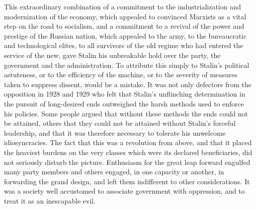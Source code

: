 This extraordinary combination of a commitment to the industrialization and modernization of the economy, which appealed to convinced Marxists as a vital step on the road to socialism, and a commitment to a revival of the power and prestige of the Russian nation, which appealed to the army, to the bureaucratic and technological elites, to all survivors of the old regime who had entered the service of the new, gave Stalin his unbreakable hold over the party, the government and the administration. To attribute this simply to Stalin's political astuteness, or to the efficiency of the machine, or to the severity of measures taken to suppress dissent, would be a mistake. It was not only defectors from the opposition in 1928 and 1929 who felt that Stalin's unflinching determination in the pursuit of long-desired ends outweighed the harsh methods used to enforce his policies. Some people argued that without these methods the ends could not be attained, others that they could not be attained without Stalin's forceful leadership, and that it was therefore necessary to tolerate his unwelcome idiosyncracies. The fact that this was a revolution from above, and that it placed the heaviest burdens on the very classes which were its declared beneficiaries, did not seriously disturb the picture. Enthusiasm for the great leap forward engulfed many party members and others engaged, in one capacity or another, in forwarding the grand design, and left them indifferent to other considerations. It was a society well accustomed to associate government with oppression, and to treat it as an inescapable evil. 


